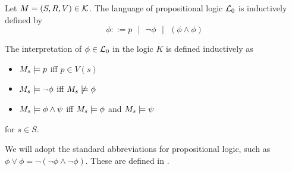 \begin{defn} \label{propLogic}
Let $M = (S, R, V) \in \mathcal{K}$.
The language of propositional logic $\mathcal{L}_0$ is inductively defined by
\[
	\phi ::= p \text{ } | \text{ } \neg \phi \text{ } | \text{ } (\phi \land \phi)
\]

The interpretation of $\phi \in \mathcal{L}_0$ in the logic $K$ is defined inductively as

\begin{itemize}
	\item $M_s \models p$ iff $p \in V(s)$
	\item $M_s \models \neg \phi$ iff $M_s \not \models \phi$
	\item $M_s \models \phi \land \psi$ iff $M_s \models \phi$ and $M_s \models \psi$
\end{itemize}

for $s \in S$.
\end{defn}

We will adopt the standard abbreviations for propositional logic, such as $\phi \lor \phi =
\neg(\neg \phi \land \neg \phi)$.
These are defined in \cite{blackburn2002modal}.

